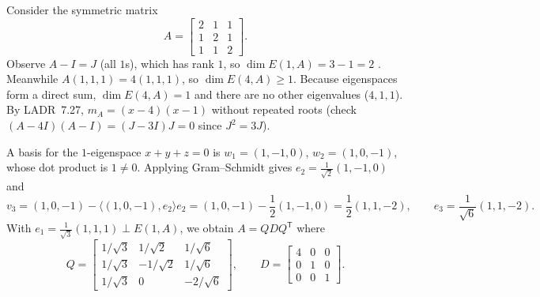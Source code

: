 \documentclass[10pt]{scrartcl}
\begin{document}
\begin{example*}
  Consider the symmetric matrix
  \[
    A = \begin{bmatrix}2&1&1\\1&2&1\\1&1&2\end{bmatrix}.
  \]
  Observe $A-I=J$ (all $1$s), which has rank $1$, so $\dim E(1,A)=3-1=2$ . Meanwhile $A(1,1,1)=4(1,1,1)$, so $\dim E(4,A)\ge1$. Because eigenspaces form a direct sum, $\dim E(4,A)=1$ and there are no other eigenvalues ($4,1,1$). By LADR~7.27, $m_A=(x-4)(x-1)$ without repeated roots (check $(A-4I)(A-I)=(J-3I)J=0$ since $J^2=3J$).

  A basis for the $1$-eigenspace $x+y+z=0$ is $w_1=(1,-1,0)$, $w_2=(1,0,-1)$, whose dot product is $1\neq0$. Applying Gram--Schmidt gives $e_2=\frac{1}{\sqrt{2}}(1,-1,0)$ and
  \[
    v_3 = (1,0,-1) - \langle(1,0,-1),e_2\rangle e_2 = (1,0,-1)-\frac12(1,-1,0)=\frac12(1,1,-2), \qquad e_3=\frac{1}{\sqrt{6}}(1,1,-2).
  \]
  With $e_1=\frac{1}{\sqrt{3}}(1,1,1)\perp E(1,A)$, we obtain $A=QDQ^{\mathsf T}$ where
  \[
    Q = \begin{bmatrix}1/\sqrt{3}&1/\sqrt{2}&1/\sqrt{6}\\1/\sqrt{3}&-1/\sqrt{2}&1/\sqrt{6}\\1/\sqrt{3}&0&-2/\sqrt{6}\end{bmatrix}, \qquad
    D = \begin{bmatrix}4&0&0\\0&1&0\\0&0&1\end{bmatrix}.
  \]
\end{example*}
\end{document}
